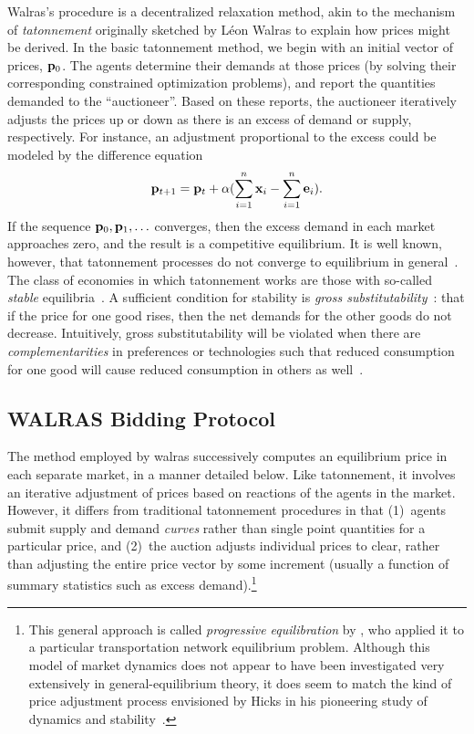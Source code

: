 {\sc Walras}'s procedure is a decentralized relaxation method, akin to the
mechanism of {\em tatonnement\/} originally sketched by L\'eon Walras to explain how
prices might be derived.
In the basic tatonnement method, we begin with an initial vector of 
prices, ${\bf p}_0$.  The agents determine their demands at those prices 
(by solving their corresponding constrained optimization problems), and 
report the quantities demanded to the ``auctioneer''.  Based on these 
reports, the auctioneer iteratively adjusts the prices up or
down as there is an excess of demand or supply, respectively.
For instance, an adjustment proportional to the excess could be modeled 
by the difference equation
\begin{displaymath}
 {\bf p}_{t+1} = {\bf p}_{t} + 
       \alpha (\sum_{i=1}^n {\bf x}_{i} - \sum_{i=1}^n {\bf e}_{i}).
\end{displaymath}
If the sequence ${\bf p}_0,{\bf p}_1,\ldots$ converges, then the 
excess demand in each market approaches zero, and the result is a
competitive equilibrium.  
It is well known, however, that tatonnement processes do not
converge to equilibrium in general~\cite{Scarf84a}.
The class of economies in which
tatonnement works are those with so-called {\em stable} 
equilibria~\cite{Hicks48}.
A sufficient condition for stability is {\em gross 
substitutability}~\cite{Arrow77}: that if the price for one good rises, 
then the net demands for the other goods do not decrease.
Intuitively, gross substitutability will be violated when there are
{\em complementarities\/} in preferences or technologies such that reduced 
consumption for one good will cause reduced consumption in others as 
well~\cite{Samuelson74}.

\subsection{WALRAS Bidding Protocol}

The method employed by {\sc walras} successively computes an equilibrium
price in each separate market, in a manner detailed below.
Like tatonnement, it involves an iterative adjustment 
of prices based on reactions of the agents in the market.
However, it differs from traditional tatonnement procedures in that (1)~agents
submit supply and demand {\em curves\/} rather than single point
quantities for a particular price, and
(2)~the auction adjusts individual prices to clear, rather than adjusting the
entire price vector by some increment (usually a function of
summary statistics such as excess demand).\footnote{This 
general approach is called {\em progressive equilibration\/} by
, who applied it to a particular 
transportation network equilibrium problem.
Although this model of market dynamics does not appear to have been 
investigated very extensively in general-equilibrium theory, it does seem to 
match the kind of price adjustment process envisioned by Hicks in his 
pioneering study of dynamics and stability~\cite{Hicks48}.}

